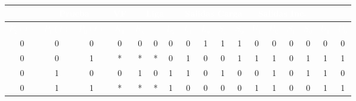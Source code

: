 \documentclass[12pt, letterpaper]{article}
\begin{document}
\begin{table}[H]
\renewcommand{\arraystretch}{1.2}
\begin{center}
    \begin{adjustbox}{width=\textwidth}
    \begin{tabular}{|ccc|cc|c|ccc|cccc|cccc|}
    \hline
    \rowcolor{black!80}
    \multicolumn{3}{|c|}{\textcolor{white}{\textbf{Estado Presente}}} & \multicolumn{2}{c|}{\textcolor{white}{\textbf{Prueba}}} & \textcolor{white}{\textbf{VF}} & \multicolumn{3}{c|}{\textcolor{white}{\textbf{Liga}}} & \multicolumn{4}{c|}{\textcolor{white}{\textbf{Salidas Carga}}} & \multicolumn{4}{c|}{\textcolor{white}{\textbf{Salidas Inc.}}}\\
    \hline
    \rowcolor{black!80}
    \textcolor{white}{\textbf{$P_2(t)$}} & \textcolor{white}{\textbf{$P_1(t)$}} & \textcolor{white}{\textbf{$P_0(t)$}} & \textcolor{white}{\textbf{$K_1$}} & \textcolor{white}{\textbf{$K_0$}} & &\textcolor{white}{\textbf{$L_2$}} & \textcolor{white}{\textbf{$L_1$}} & \textcolor{white}{\textbf{$L_0$}} & \textcolor{white}{\textbf{$S_1$}} & \textcolor{white}{\textbf{$S_0$}} & \textcolor{white}{\textbf{$\overline{U_1}$}} & \textcolor{white}{\textbf{$\overline{U_0}$}} & \textcolor{white}{\textbf{$S_1$}} & \textcolor{white}{\textbf{$S_0$}} & \textcolor{white}{\textbf{$\overline{U_1}$}} & \textcolor{white}{\textbf{$\overline{U_0}$}} \\
    \hline
    0 & 0 & 0 & 0 & 0 & 0 & 0 & 0 & 1 & \cellcolor{ForestGreen!90}1 & \cellcolor{ForestGreen!90}1 & \cellcolor{ForestGreen!90}0 & \cellcolor{ForestGreen!90}0 & \cellcolor{LimeGreen}0 & \cellcolor{LimeGreen}0 & \cellcolor{LimeGreen}0 & \cellcolor{LimeGreen}0 \\
    \hline
    0 & 0 & 1 & * & * & * & 0 & 1 & 0 & \cellcolor{ForestGreen!90}0 & \cellcolor{ForestGreen!90}1 & \cellcolor{ForestGreen!90}1 & \cellcolor{ForestGreen!90}1 & \cellcolor{LimeGreen}0 & \cellcolor{LimeGreen}1 & \cellcolor{LimeGreen}1 & \cellcolor{LimeGreen}1 \\
    \hline
    0 & 1 & 0 & 0 & 1 & 0 & 1 & 1 & 0 & \cellcolor{ForestGreen!90}1 & \cellcolor{ForestGreen!90}0 & \cellcolor{ForestGreen!90}0 & \cellcolor{ForestGreen!90}1 & \cellcolor{LimeGreen}0 & \cellcolor{LimeGreen}1 & \cellcolor{LimeGreen}1 & \cellcolor{LimeGreen}0 \\
    \hline
    0 & 1 & 1 & * & * & * & 1 & 0 & 0 & \cellcolor{ForestGreen!90}0 & \cellcolor{ForestGreen!90}0 & \cellcolor{ForestGreen!90}1 & \cellcolor{ForestGreen!90}1 & \cellcolor{LimeGreen}0 & \cellcolor{LimeGreen}0 & \cellcolor{LimeGreen}1 & \cellcolor{LimeGreen}1 \\

\end{tabular}
\end{adjustbox}
\end{center}
\end{table}
\end{document}
